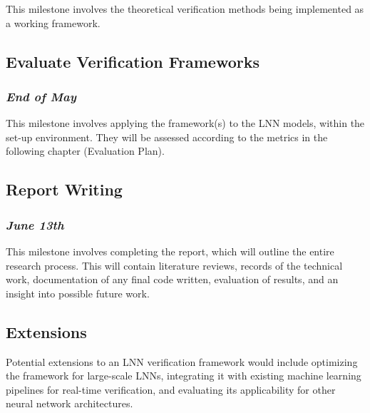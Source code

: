 This milestone involves the theoretical verification methods being implemented as a working framework.

\subsection*{Evaluate Verification Frameworks}
\subsubsection*{\textit{End of May}}


This milestone involves applying the framework(s) to the LNN models, within the set-up environment. They will be assessed according to the metrics in the following chapter (Evaluation Plan).

\subsection*{Report Writing}
\subsubsection*{\textit{June 13th}}

This milestone involves completing the report, which will outline the entire research process. This will contain literature reviews, records of the technical work, documentation of any final code written, evaluation of results, and an insight into possible future work.

\subsection*{Extensions}

Potential extensions to an LNN verification framework would include optimizing the framework for large-scale LNNs, integrating it with existing machine learning pipelines for real-time verification, and evaluating its applicability for other neural network architectures.